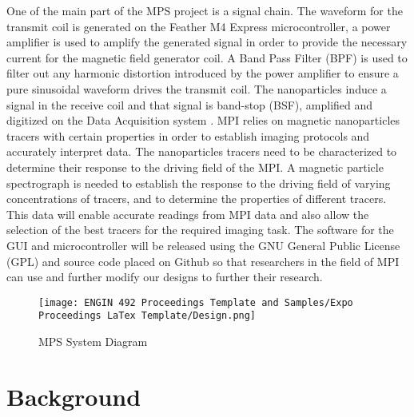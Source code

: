\documentclass[fleqn,10pt]{document} %
\begin{document}
    One of the main part of the MPS project is a signal chain. The waveform for the transmit coil is generated on the Feather M4 Express microcontroller, a power amplifier is used to amplify the generated signal in order to provide the necessary current for the magnetic field generator coil. A Band Pass Filter (BPF) is used to filter out any harmonic distortion introduced by the power amplifier to ensure a pure sinusoidal waveform drives the transmit coil. The nanoparticles induce a signal in the receive coil and that signal is band-stop (BSF), amplified and digitized on the Data Acquisition system \cite{p5} \cite{p6}. 
MPI relies on magnetic nanoparticles tracers with certain properties in order to establish imaging protocols and accurately interpret data. The nanoparticles tracers need to be characterized to determine their response to the driving field of the MPI. A magnetic particle spectrograph is needed to establish the response to the driving field of varying concentrations of tracers, and to determine the properties of different tracers. This data will enable accurate readings from MPI data and also allow the selection of the best tracers for the required imaging task.
The software for the GUI and microcontroller will be released using the GNU General Public License (GPL) and source code placed on Github so that researchers in the field of MPI can use and further modify our designs to further their research.
 

\begin{figure*}[ht]\centering
\texttt{[image: ENGIN 492 Proceedings Template and Samples/Expo Proceedings LaTex Template/Design.png]}
\caption{MPS System Diagram}
\label{fig:sytem}
\end{figure*}

	
	
	
	\section{Background}
	
\end{document}
